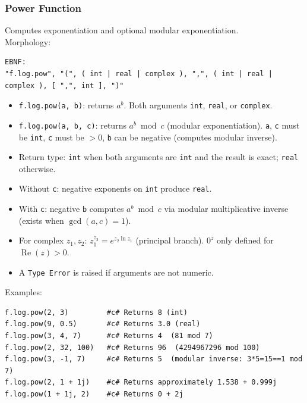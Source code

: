 \subsubsection{Power Function}
Computes exponentiation and optional modular exponentiation. \\
Morphology:
\begin{verbatim}
EBNF:
"f.log.pow", "(", ( int | real | complex ), ",", ( int | real | complex ), [ ",", int ], ")"
\end{verbatim}
\begin{itemize}
\item \texttt{f.log.pow(a, b)}: returns $a^b$. Both arguments \texttt{int}, \texttt{real}, or \texttt{complex}.
\item \texttt{f.log.pow(a, b, c)}: returns $a^b \bmod c$ (modular exponentiation). \texttt{a}, \texttt{c} must be \texttt{int}, \texttt{c} must be $> 0$, \texttt{b} can be negative (computes modular inverse).
\item Return type: \texttt{int} when both arguments are \texttt{int} and the result is exact; \texttt{real} otherwise.
\item Without \texttt{c}: negative exponents on \texttt{int} produce \texttt{real}.
\item With \texttt{c}: negative \texttt{b} computes $a^b \bmod c$ via modular multiplicative inverse (exists when $\gcd(a, c) = 1$).
\item For complex $z_1, z_2$: $z_1^{z_2} = e^{z_2 \ln z_1}$ (principal branch). $0^z$ only defined for $\operatorname{Re}(z) > 0$.
\item A \texttt{Type Error} is raised if arguments are not numeric.
\end{itemize}
Examples:
\begin{verbatim}
f.log.pow(2, 3)         #c# Returns 8 (int)
f.log.pow(9, 0.5)       #c# Returns 3.0 (real)
f.log.pow(3, 4, 7)      #c# Returns 4  (81 mod 7)
f.log.pow(2, 32, 100)   #c# Returns 96  (4294967296 mod 100)
f.log.pow(3, -1, 7)     #c# Returns 5  (modular inverse: 3*5=15==1 mod 7)
f.log.pow(2, 1 + 1j)    #c# Returns approximately 1.538 + 0.999j
f.log.pow(1 + 1j, 2)    #c# Returns 0 + 2j
\end{verbatim}

